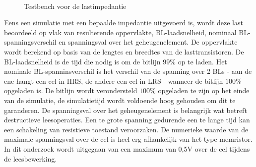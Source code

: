 \begin{figure}[!ht]
\centering
{}
\\
\caption[Testbench voor de lastimpedantie]{Testbench voor de lastimpedantie}\label{fig:simsetup}
\end{figure}

Eens een simulatie met een bepaalde impedantie uitgevoerd is, wordt deze last beoordeeld op vlak van resulterende oppervlakte, BL-laadsnelheid, nominaal BL-spanningsverschil en spanningsval over het geheugenelement. De oppervlakte wordt berekend op basis van de lengtes en breedtes van de lasttransistoren. De BL-laadsnelheid is de tijd die nodig is om de bitlijn $99\%$ op te laden. Het nominale BL-spanninsverschil is het verschil van de spanning over 2 BLs - aan de ene hangt een cel in HRS, de andere een cel in LRS - wanneer de bitlijn $100\%$ opgeladen is. De bitlijn wordt verondersteld $100\%$ opgeladen te zijn op het einde van de simulatie, de simulatietijd wordt voldoende hoog gehouden om dit te garanderen. De spanningsval over het geheugenelement is belangrijk wat betreft destructieve leesoperaties. Een te grote spanning gedurende een te lange tijd kan een schakeling van resistieve toestand veroorzaken. De numerieke waarde van de maximale spanningsval over de cel is heel erg afhankelijk van het type memristor. In dit onderzoek wordt uitgegaan van een maximum van 0,5V over de cel tijdens de leesbewerking\cite{ppt:model}.

